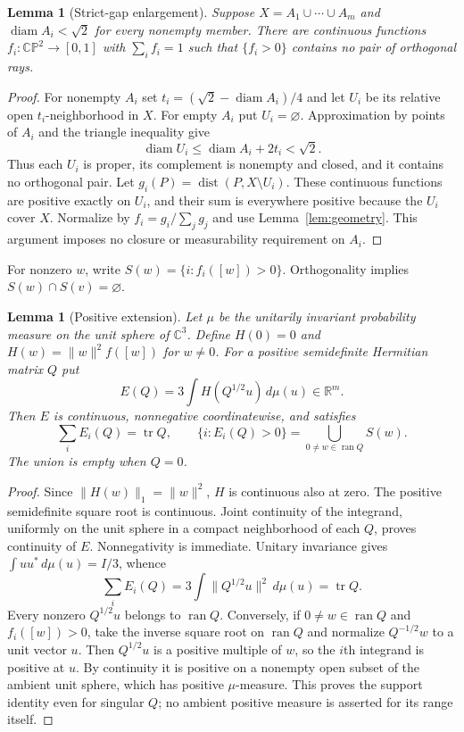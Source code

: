 \documentclass[11pt,a4paper]{article}
\newtheorem{lemma}[theorem]{Lemma}
\theoremstyle{remark}
\numberwithin{equation}{section}
\newcommand{\C}{\mathbb C}
\newcommand{\R}{\mathbb R}
\newcommand{\CP}{\mathbb{CP}}
\newcommand{\tr}{\operatorname{tr}}
\newcommand{\ran}{\operatorname{ran}}
\newcommand{\diam}{\operatorname{diam}}
\newcommand{\norm}[1]{\lVert #1\rVert}
\begin{document}
\begin{lemma}[Strict-gap enlargement]\label{lem:gap}
Suppose $X=A_1\cup\cdots\cup A_m$ and $\diam A_i<\sqrt2$ for every nonempty member. There are continuous functions $f_i:\CP^2\to[0,1]$ with $\sum_i f_i=1$ such that $\{f_i>0\}$ contains no pair of orthogonal rays.
\end{lemma}
\begin{proof}
For nonempty $A_i$ set $t_i=(\sqrt2-\diam A_i)/4$ and let $U_i$ be its relative open $t_i$-neighborhood in $X$. For empty $A_i$ put $U_i=\varnothing$. Approximation by points of $A_i$ and the triangle inequality give
\[
 \diam U_i\le\diam A_i+2t_i<\sqrt2.
\]
Thus each $U_i$ is proper, its complement is nonempty and closed, and it contains no orthogonal pair. Let $g_i(P)=\operatorname{dist}(P,X\setminus U_i)$. These continuous functions are positive exactly on $U_i$, and their sum is everywhere positive because the $U_i$ cover $X$. Normalize by $f_i=g_i/\sum_jg_j$ and use Lemma~\ref{lem:geometry}. This argument imposes no closure or measurability requirement on $A_i$.
\end{proof}
For nonzero $w$, write $S(w)=\{i:f_i([w])>0\}$. Orthogonality implies $S(w)\cap S(v)=\varnothing$.

\begin{lemma}[Positive extension]\label{lem:positive}
Let $\mu$ be the unitarily invariant probability measure on the unit sphere of $\C^3$. Define $H(0)=0$ and $H(w)=\norm w^2 f([w])$ for $w\ne0$. For a positive semidefinite Hermitian matrix $Q$ put
\begin{equation}\label{eq:extension}
 E(Q)=3\int H(Q^{1/2}u)\,d\mu(u)\in\R^m.
\end{equation}
Then $E$ is continuous, nonnegative coordinatewise, and satisfies
\begin{equation}\label{eq:trace-support}
 \sum_iE_i(Q)=\tr Q,\qquad
 \{i:E_i(Q)>0\}=\bigcup_{0\ne w\in\ran Q}S(w).
\end{equation}
The union is empty when $Q=0$.
\end{lemma}
\begin{proof}
Since $\norm{H(w)}_1=\norm w^2$, $H$ is continuous also at zero. The positive semidefinite square root is continuous. Joint continuity of the integrand, uniformly on the unit sphere in a compact neighborhood of each $Q$, proves continuity of $E$. Nonnegativity is immediate. Unitary invariance gives $\int uu^*\,d\mu(u)=I/3$, whence
\[
 \sum_iE_i(Q)=3\int\norm{Q^{1/2}u}^2\,d\mu(u)=\tr Q.
\]
Every nonzero $Q^{1/2}u$ belongs to $\ran Q$. Conversely, if $0\ne w\in\ran Q$ and $f_i([w])>0$, take the inverse square root on $\ran Q$ and normalize $Q^{-1/2}w$ to a unit vector $u$. Then $Q^{1/2}u$ is a positive multiple of $w$, so the $i$th integrand is positive at $u$. By continuity it is positive on a nonempty open subset of the ambient unit sphere, which has positive $\mu$-measure. This proves the support identity even for singular $Q$; no ambient positive measure is asserted for its range itself.
\end{proof}
\end{document}
